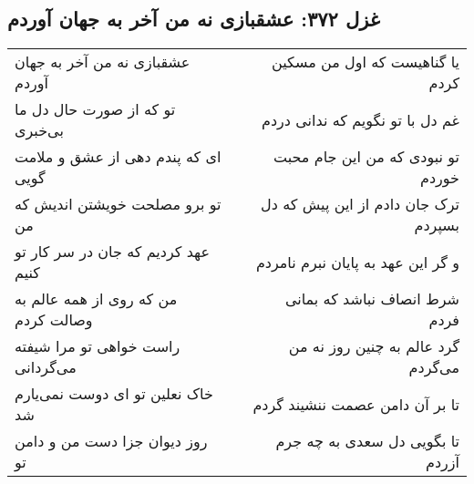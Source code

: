 \begin{center}
\section*{غزل ۳۷۲: عشقبازی نه من آخر به جهان آوردم}
\label{sec:372}
\begin{longtable}{l p{0.5cm} r}
عشقبازی نه من آخر به جهان آوردم
&&
یا گناهیست که اول من مسکین کردم
\\
تو که از صورت حال دل ما بی‌خبری
&&
غم دل با تو نگویم که ندانی دردم
\\
ای که پندم دهی از عشق و ملامت گویی
&&
تو نبودی که من این جام محبت خوردم
\\
تو برو مصلحت خویشتن اندیش که من
&&
ترک جان دادم از این پیش که دل بسپردم
\\
عهد کردیم که جان در سر کار تو کنیم
&&
و گر این عهد به پایان نبرم نامردم
\\
من که روی از همه عالم به وصالت کردم
&&
شرط انصاف نباشد که بمانی فردم
\\
راست خواهی تو مرا شیفته می‌گردانی
&&
گرد عالم به چنین روز نه من می‌گردم
\\
خاک نعلین تو ای دوست نمی‌یارم شد
&&
تا بر آن دامن عصمت ننشیند گردم
\\
روز دیوان جزا دست من و دامن تو
&&
تا بگویی دل سعدی به چه جرم آزردم
\\
\end{longtable}
\end{center}
